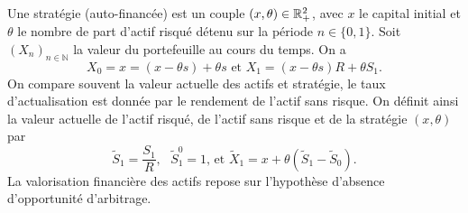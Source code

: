 \noindent Une stratégie (auto-financée) est un couple $(x,\theta)\in \mathbb{R}_+^2$, avec 
$x$ le capital initial et $\theta$ le nombre de part d'actif risqué détenu sur la période $n\in\{0, 1\}$. Soit $(X_n)_{n\in\mathbb{N}}$ la valeur du portefeuille au cours du temps. On a
$$
X_0 = x = (x - \theta s) + \theta s\text{ et }X_1 = (x-\theta s)R+ \theta S_1.
$$
On compare souvent la valeur actuelle des actifs et stratégie, le taux d'actualisation est donnée par le rendement de l'actif sans risque. On définit ainsi la valeur actuelle de l'actif risqué, de l'actif sans risque et de la stratégie $(x,\theta)$ par 
$$
\tilde{S}_1 = \frac{S_1}{R},\text{ }\tilde{S}_1^0 = 1\text{, et }\tilde{X}_1 = x + \theta(\tilde{S}_1 - \tilde{S}_0).
$$
La valorisation financière des actifs repose sur l'hypothèse d'absence d'opportunité d'arbitrage. 

